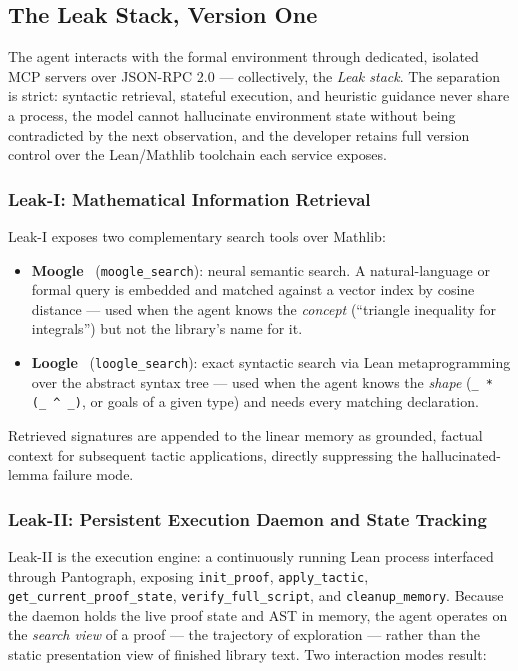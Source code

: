 \documentclass[12pt, a4paper]{article}
\begin{document}
\subsection{The Leak Stack, Version One}

The agent interacts with the formal environment through dedicated, isolated
MCP servers over JSON-RPC 2.0 --- collectively, the \emph{Leak stack}. The
separation is strict: syntactic retrieval, stateful execution, and heuristic
guidance never share a process, the model cannot hallucinate environment
state without being contradicted by the next observation, and the
developer retains full version control over the Lean/Mathlib toolchain each
service exposes.

\subsubsection{Leak-I: Mathematical Information Retrieval}

Leak-I exposes two complementary search tools over Mathlib:

\begin{itemize}[leftmargin=*]
  \item \textbf{Moogle}~\cite{moogle} (\texttt{moogle\_search}): neural semantic search.
    A natural-language or formal query is embedded and matched against a
    vector index by cosine distance --- used when the agent knows the
    \emph{concept} (``triangle inequality for integrals'') but not the
    library's name for it.
  \item \textbf{Loogle}~\cite{loogle} (\texttt{loogle\_search}): exact syntactic search
    via Lean metaprogramming over the abstract syntax tree --- used when the
    agent knows the \emph{shape} (\texttt{\_ * (\_ \^{} \_)}, or goals of a
    given type) and needs every matching declaration.
\end{itemize}

Retrieved signatures are appended to the linear memory as grounded, factual
context for subsequent tactic applications, directly suppressing the
hallucinated-lemma failure mode.

\subsubsection{Leak-II: Persistent Execution Daemon and State Tracking}

Leak-II is the execution engine: a continuously running Lean process
interfaced through Pantograph, exposing \texttt{init\_proof},
\texttt{apply\_tactic}, \texttt{get\_current\_proof\_state},
\texttt{verify\_full\_script}, and \texttt{cleanup\_memory}. Because the
daemon holds the live proof state and AST in memory, the agent operates on
the \emph{search view} of a proof --- the trajectory of exploration ---
rather than the static presentation view of finished library text. Two
interaction modes result:
\end{document}
